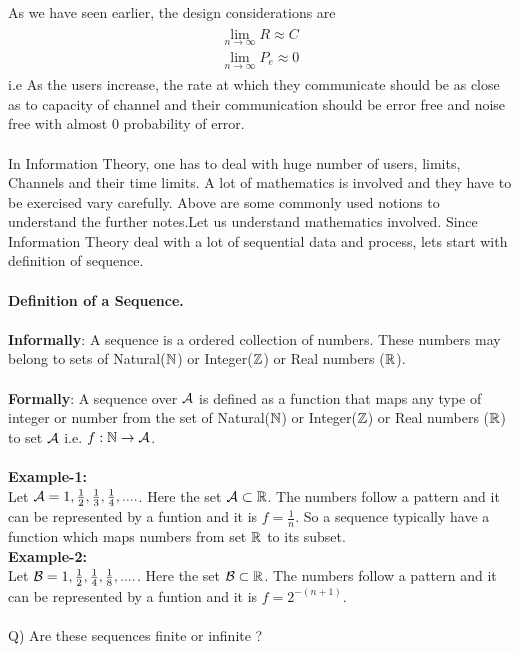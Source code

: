 \documentclass[a4paper]{article}
\begin{document}
As we have seen earlier, the design considerations are
\begin{align}
\begin{split}
\lim_{n \to \infty} R \approx C
\\
\lim_{n \to \infty} P_e \approx 0
\end{split}
\end{align}
i.e As the users increase, the rate at which they communicate should be as close as to capacity of channel and their communication should be error free and noise free with almost 0 probability of error.\\
\\
In Information Theory, one has to deal with huge number of users, limits, Channels and their time limits. A lot of mathematics is involved and they have to be exercised vary carefully. Above are some commonly used notions to understand the further notes.Let us understand mathematics involved. Since Information Theory deal with a lot of sequential data and process, lets start with definition of sequence.
\\
\\
\textbf{Definition of a Sequence.}
\\
\\
\textbf{Informally}: A sequence is a ordered collection of numbers. These numbers may belong to sets of Natural($\mathbb N$) or Integer($\mathbb Z$) or Real numbers ($\mathbb R$).\\
\\
\textbf{Formally}: A sequence over $\mathcal A$ is defined as a function that maps any type of integer or number from the set of Natural($\mathbb N$) or Integer($\mathbb Z$) or Real numbers ($\mathbb R$) to set $\mathcal A$ i.e. $f:\mathbb N \to \mathcal A$. \\
\\
\textbf{Example-1:}
\\
Let $\mathcal A = {1,\frac{1}{2},\frac{1}{3},\frac{1}{4},....}$.
Here the set $\mathcal A \subset \mathbb R$. The numbers follow a pattern and it can be represented by a funtion and it is $f = \frac{1}{n}$. So a sequence typically have a function which maps numbers from set $\mathbb R$ to its subset.\\
\textbf{Example-2:}
\\
Let $\mathcal B = {1,\frac{1}{2},\frac{1}{4},\frac{1}{8},....}$.
Here the set $\mathcal B \subset \mathbb R$. The numbers follow a pattern and it can be represented by a funtion and it is $f = 2^{-(n+1)}$. 
\\
\\
Q) Are these sequences finite or infinite ?
\\
\end{document}
